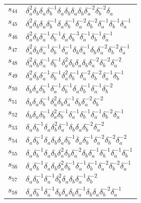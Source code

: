 \documentclass{article}
\begin{document}
\begin{center}
\begin{tabular}{ll}
$s_{44}$ & $\delta_a^{2}\delta_b^{}\delta_a^{}\delta_b^{-1}\delta_a^{}\delta_b^{}\delta_a^{}\delta_b^{}\delta_a^{-2}\delta_b^{-2}\delta_a^{}$ \\
$s_{45}$ & $\delta_a^{2}\delta_b^{}\delta_a^{}\delta_b^{-1}\delta_a^{}\delta_b^{-1}\delta_a^{-2}\delta_b^{-2}\delta_a^{-1}\delta_b^{-1}\delta_a^{-1}$ \\
$s_{46}$ & $\delta_a^{2}\delta_b^{}\delta_a^{-1}\delta_b^{-1}\delta_a^{}\delta_b^{-3}\delta_a^{-1}\delta_b^{-1}\delta_a^{-1}$ \\
$s_{47}$ & $\delta_a^{2}\delta_b^{}\delta_a^{-1}\delta_b^{-1}\delta_a^{-1}\delta_b^{}\delta_a^{-1}\delta_b^{}\delta_a^{-2}\delta_b^{-2}\delta_a^{-1}$ \\
$s_{48}$ & $\delta_a^{2}\delta_b^{}\delta_a^{-1}\delta_b^{-1}\delta_a^{2}\delta_b^{}\delta_a^{}\delta_b^{}\delta_a^{-2}\delta_b^{-2}\delta_a^{-2}$ \\
$s_{49}$ & $\delta_a^{2}\delta_b^{}\delta_a^{-1}\delta_b^{-1}\delta_a^{2}\delta_b^{-1}\delta_a^{-2}\delta_b^{-2}\delta_a^{-1}\delta_b^{-1}$ \\
$s_{50}$ & $\delta_b^{}\delta_a^{}\delta_b^{-1}\delta_a^{-1}\delta_b^{-1}\delta_a^{}\delta_b^{-1}\delta_a^{-1}\delta_b^{-2}$ \\
$s_{51}$ & $\delta_b^{}\delta_a^{}\delta_b^{-1}\delta_a^{2}\delta_b^{}\delta_a^{-1}\delta_b^{}\delta_a^{-2}\delta_b^{-2}$ \\
$s_{52}$ & $\delta_b^{}\delta_a^{}\delta_b^{-1}\delta_a^{2}\delta_b^{-1}\delta_a^{-1}\delta_b^{-1}\delta_a^{-1}\delta_b^{-2}\delta_a^{-1}$ \\
$s_{53}$ & $\delta_a^{}\delta_b^{-1}\delta_a^{}\delta_b^{2}\delta_a^{-1}\delta_b^{}\delta_a^{}\delta_b^{-2}\delta_a^{-2}$ \\
$s_{54}$ & $\delta_a^{}\delta_b^{-1}\delta_a^{}\delta_b^{}\delta_a^{}\delta_b^{-1}\delta_a^{}\delta_b^{-1}\delta_a^{-2}\delta_b^{-2}\delta_a^{-2}$ \\
$s_{55}$ & $\delta_a^{}\delta_b^{-1}\delta_a^{}\delta_b^{}\delta_a^{2}\delta_b^{}\delta_a^{-2}\delta_b^{}\delta_a^{-1}\delta_b^{-1}\delta_a^{-1}\delta_b^{-1}$ \\
$s_{56}$ & $\delta_a^{}\delta_b^{-1}\delta_a^{}\delta_b^{}\delta_a^{2}\delta_b^{-1}\delta_a^{-1}\delta_b^{-1}\delta_a^{-2}\delta_b^{-2}\delta_a^{-1}$ \\
$s_{57}$ & $\delta_a^{}\delta_b^{-1}\delta_a^{-1}\delta_b^{2}\delta_a^{}\delta_b^{}\delta_a^{-1}\delta_b^{-2}$ \\
$s_{58}$ & $\delta_a^{}\delta_b^{-1}\delta_a^{-1}\delta_b^{}\delta_a^{}\delta_b^{}\delta_a^{-1}\delta_b^{}\delta_a^{}\delta_b^{-2}\delta_a^{-1}$ \\

\end{tabular}
\end{center}
\end{document}
